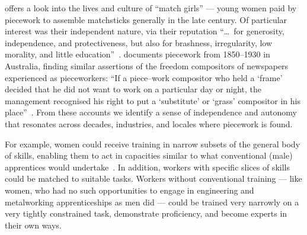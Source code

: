 \documentclass[trackingWork]{subfiles}
\begin{document}
\citeauthor{10.2307/3827491} offers a look into the lives and culture of ``match girls''
--- young women paid by piecework to assemble matchsticks generally in the late  century.
Of particular interest was their independent nature, via their reputation ``\dots~for generosity, independence, and protectiveness,
but also for brashness, irregularity, low morality, and little education''~\cite{10.2307/3827491}.
\citeauthor{10.2307/27508091} documents piecework from 1850--1930 in Australia,
finding similar assertions of the freedom compositors of newspapers experienced as pieceworkers:
``If a piece--work compositor who held a `frame' decided that he did not want to work on a particular day or night,
the management recognised his right to put a `substitute' or `grass' compositor in his place''~\cite{10.2307/27508091}.
From these accounts we identify a sense of independence and autonomy that resonates across decades, industries, and locales where piecework is found.

For example, women could receive training in narrow subsets of the general body of skills, enabling them to act in capacities similar to what conventional (male) apprentices would undertake~\cite{hart2013rise}. 
In addition, workers with specific slices of skills could be matched to suitable tasks.
Workers without conventional training
--- like women, who had no such opportunities
to engage in engineering and metalworking apprenticeships as men did ---
could be trained very narrowly on a very tightly constrained task,
demonstrate proficiency, and become experts in their own ways.
\end{document}
